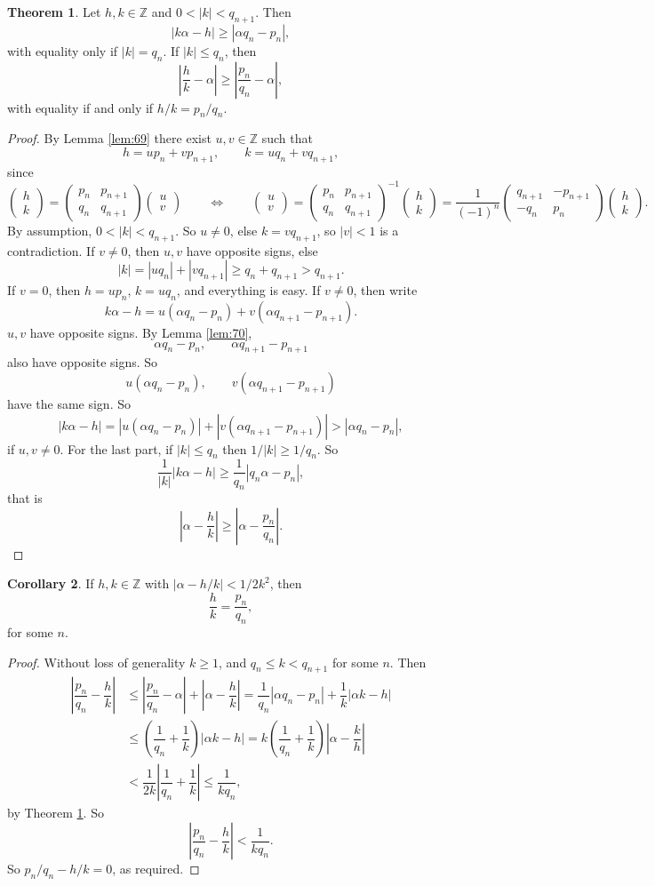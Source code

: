 \documentclass{article}
\newcommand{\Z}{\mathbb{Z}}
\newcommand{\rb}[1]{\left( #1 \right)}
\newcommand{\abs}[1]{\left\lvert #1 \right\rvert}
\newcommand{\two}[2]{\begin{pmatrix} #1 \\ #2 \end{pmatrix}}
\theoremstyle{definition}\newtheorem{definition}{Definition}
\theoremstyle{definition}\newtheorem{remark}[definition]{Remark}
\theoremstyle{definition}\newtheorem*{example}{Example}
\theoremstyle{definition}\newtheorem*{note}{Note}
\newtheorem{theorem}[definition]{Theorem}
\newtheorem{corollary}[definition]{Corollary}
\begin{document}
\begin{theorem}
\label{thm:74}
Let $ h, k \in \Z $ and $ 0 < \abs{k} < q_{n + 1} $. Then
$$ \abs{k\alpha - h} \ge \abs{\alpha q_n - p_n}, $$
with equality only if $ \abs{k} = q_n $. If $ \abs{k} \le q_n $, then
$$ \abs{\dfrac{h}{k} - \alpha} \ge \abs{\dfrac{p_n}{q_n} - \alpha}, $$
with equality if and only if $ h / k = p_n / q_n $.
\end{theorem}

\begin{proof}
By Lemma \ref{lem:69} there exist $ u, v \in \Z $ such that
$$ h = up_n + vp_{n + 1}, \qquad k = uq_n + vq_{n + 1}, $$
since
$$ \two{h}{k} = \two{p_n & p_{n + 1}}{q_n & q_{n + 1}}\two{u}{v} \qquad \iff \qquad \two{u}{v} = \two{p_n & p_{n + 1}}{q_n & q_{n + 1}}^{-1}\two{h}{k} = \dfrac{1}{\rb{-1}^n}\two{q_{n + 1} & -p_{n + 1}}{-q_n & p_n}\two{h}{k}. $$
By assumption, $ 0 < \abs{k} < q_{n + 1} $. So $ u \ne 0 $, else $ k = vq_{n + 1} $, so $ \abs{v} < 1 $ is a contradiction. If $ v \ne 0 $, then $ u, v $ have opposite signs, else
$$ \abs{k} = \abs{uq_n} + \abs{vq_{n + 1}} \ge q_n + q_{n + 1} > q_{n + 1}. $$
If $ v = 0 $, then $ h = up_n $, $ k = uq_n $, and everything is easy. If $ v \ne 0 $, then write
$$ k\alpha - h = u\rb{\alpha q_n - p_n} + v\rb{\alpha q_{n + 1} - p_{n + 1}}. $$
$ u, v $ have opposite signs. By Lemma \ref{lem:70},
$$ \alpha q_n - p_n, \qquad \alpha q_{n + 1} - p_{n + 1} $$
also have opposite signs. So
$$ u\rb{\alpha q_n - p_n}, \qquad v\rb{\alpha q_{n + 1} - p_{n + 1}} $$
have the same sign. So
$$ \abs{k\alpha - h} = \abs{u\rb{\alpha q_n - p_n}} + \abs{v\rb{\alpha q_{n + 1} - p_{n + 1}}} > \abs{\alpha q_n - p_n}, $$
if $ u, v \ne 0 $. For the last part, if $ \abs{k} \le q_n $ then $ 1 / \abs{k} \ge 1 / q_n $. So
$$ \dfrac{1}{\abs{k}}\abs{k\alpha - h} \ge \dfrac{1}{q_n}\abs{q_n\alpha - p_n}, $$
that is
$$ \abs{\alpha - \dfrac{h}{k}} \ge \abs{\alpha - \dfrac{p_n}{q_n}}. $$
\end{proof}

\begin{corollary}
\label{cor:75}
If $ h, k \in \Z $ with $ \abs{\alpha - h / k} < 1 / 2k^2 $, then
$$ \dfrac{h}{k} = \dfrac{p_n}{q_n}, $$
for some $ n $.
\end{corollary}

\begin{proof}
Without loss of generality $ k \ge 1 $, and $ q_n \le k < q_{n + 1} $ for some $ n $. Then
\begin{align*}
\abs{\dfrac{p_n}{q_n} - \dfrac{h}{k}}
& \le \abs{\dfrac{p_n}{q_n} - \alpha} + \abs{\alpha - \dfrac{h}{k}}
= \dfrac{1}{q_n}\abs{\alpha q_n - p_n} + \dfrac{1}{k}\abs{\alpha k - h} \\
& \le \rb{\dfrac{1}{q_n} + \dfrac{1}{k}}\abs{\alpha k - h}
= k\rb{\dfrac{1}{q_n} + \dfrac{1}{k}}\abs{\alpha - \dfrac{k}{h}} \\
& < \dfrac{1}{2k}\abs{\dfrac{1}{q_n} + \dfrac{1}{k}}
\le \dfrac{1}{kq_n},
\end{align*}
by Theorem \ref{thm:74}. So
$$ \abs{\dfrac{p_n}{q_n} - \dfrac{h}{k}} < \dfrac{1}{kq_n}. $$
So $ p_n / q_n - h / k = 0 $, as required.
\end{proof}
\end{document}
